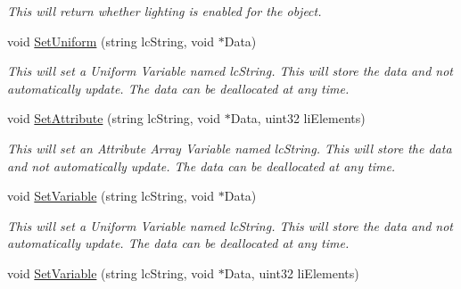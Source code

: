 \begin{DoxyCompactItemize}
\begin{DoxyCompactList}\small\item\em This will return whether lighting is enabled for the object. \end{DoxyCompactList}\item 
\hypertarget{classc_render_object_afd82d3c16f9f42165e94c343eb6c671e}{
void \hyperlink{classc_render_object_afd82d3c16f9f42165e94c343eb6c671e}{SetUniform} (string lcString, void $\ast$Data)}
\label{classc_render_object_afd82d3c16f9f42165e94c343eb6c671e}

\begin{DoxyCompactList}\small\item\em This will set a Uniform Variable named lcString. This will store the data and not automatically update. The data can be deallocated at any time. \end{DoxyCompactList}\item 
\hypertarget{classc_render_object_a3b22fe9279c0fe21c28f65c3777318aa}{
void \hyperlink{classc_render_object_a3b22fe9279c0fe21c28f65c3777318aa}{SetAttribute} (string lcString, void $\ast$Data, uint32 liElements)}
\label{classc_render_object_a3b22fe9279c0fe21c28f65c3777318aa}

\begin{DoxyCompactList}\small\item\em This will set an Attribute Array Variable named lcString. This will store the data and not automatically update. The data can be deallocated at any time. \end{DoxyCompactList}\item 
\hypertarget{classc_render_object_a4682c572a677af8b63883e7e01bbdb1c}{
void \hyperlink{classc_render_object_a4682c572a677af8b63883e7e01bbdb1c}{SetVariable} (string lcString, void $\ast$Data)}
\label{classc_render_object_a4682c572a677af8b63883e7e01bbdb1c}

\begin{DoxyCompactList}\small\item\em This will set a Uniform Variable named lcString. This will store the data and not automatically update. The data can be deallocated at any time. \end{DoxyCompactList}\item 
\hypertarget{classc_render_object_a2ac23f3c4b20c29a46be82b015ef67cb}{
void \hyperlink{classc_render_object_a2ac23f3c4b20c29a46be82b015ef67cb}{SetVariable} (string lcString, void $\ast$Data, uint32 liElements)}
\label{classc_render_object_a2ac23f3c4b20c29a46be82b015ef67cb}


\end{DoxyCompactItemize}
